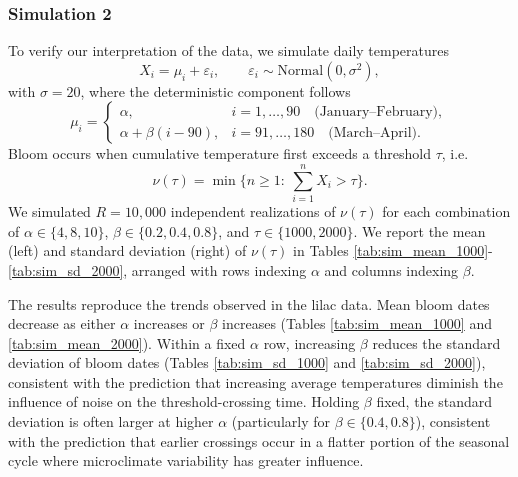 \documentclass[
]{article}
\begin{document}
{\subsubsection{Simulation 2}\label{simulation-2}

To verify our interpretation of the data, we simulate daily temperatures \[
X_i=\mu_i+\varepsilon_i,\qquad \varepsilon_i\sim \mathrm{Normal}(0,\sigma^2),
\] with \(\sigma=20\), where the deterministic component follows \[
\mu_i=
\begin{cases}
\alpha, & i=1,\dots,90 \quad \text{(January--February)},\\[2pt]
\alpha+\beta(i-90), & i=91,\dots,180 \quad \text{(March--April)}.
\end{cases}
\] Bloom occurs when cumulative temperature first exceeds a threshold
\(\tau\), i.e. \[
\nu(\tau)=\min\Big\{n\ge 1:\ \sum_{i=1}^n X_i>\tau\Big\}.
\] We simulated \(R=10{,}000\) independent realizations of \(\nu(\tau)\)
for each combination of \(\alpha\in\{4,8,10\}\),
\(\beta\in\{0.2,0.4,0.8\}\), and \(\tau\in\{1000,2000\}\).
We report the mean (left) and standard deviation (right) of \(\nu(\tau)\)
in Tables \ref{tab:sim_mean_1000}-\ref{tab:sim_sd_2000},
arranged with rows indexing \(\alpha\) and columns indexing \(\beta\).

The results reproduce the trends observed in the lilac
data. Mean bloom dates decrease as either
\(\alpha\) increases or \(\beta\) increases
(Tables \ref{tab:sim_mean_1000} and
\ref{tab:sim_mean_2000}). Within a fixed \(\alpha\) row, increasing
\(\beta\) reduces the standard deviation of bloom dates
(Tables \ref{tab:sim_sd_1000} and
\ref{tab:sim_sd_2000}), consistent with the prediction that
increasing average temperatures diminish the influence of noise on the
threshold-crossing time. Holding \(\beta\) fixed, the standard deviation is often
larger at higher \(\alpha\) (particularly for \(\beta\in\{0.4,0.8\}\)),
consistent with the prediction that earlier crossings
occur in a flatter portion of the seasonal cycle where microclimate
variability has greater influence.

\begin{table}[t]
\centering
\caption{Simulated mean and standard deviation of the bloom date
$\nu(t)$ across $R=10{,}000$ replicates with thresholds $\tau\in\{1000,2000\}$. Rows denote the winter
temperature ($\alpha$), and columns denote spring warming ($\beta$).}
\label{tab:sim_piecewise_all}

\setlength{\tabcolsep}{6pt}
\renewcommand{\arraystretch}{1.15}


\end{table}}
\end{document}
